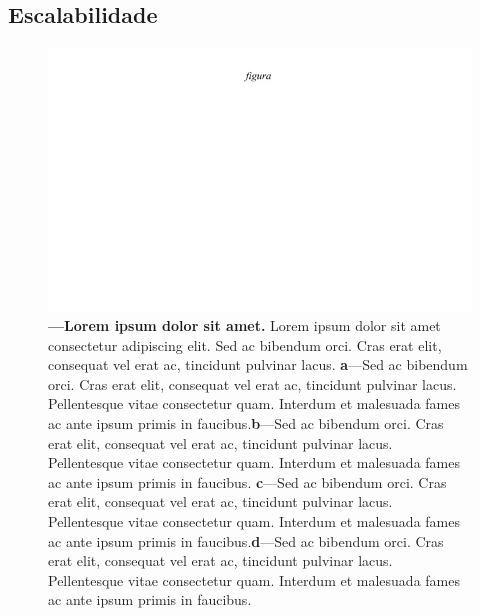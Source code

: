 \documentclass[./main.tex]{subfiles}
\begin{document}
\subsection{Escalabilidade}

\begin{figure}[t!] 
\centering				
\includegraphics[width=0.98\linewidth]{figs/fig_m.jpg}		
\caption[Lorem ipsum dolor sit amet]
{\textbf{---\;Lorem ipsum dolor sit amet.}
    Lorem ipsum dolor sit amet consectetur adipiscing elit. Sed ac bibendum orci. Cras erat elit, consequat vel erat ac, tincidunt pulvinar lacus. \;\textbf{a}\;---\;Sed ac bibendum orci. Cras erat elit, consequat vel erat ac, tincidunt pulvinar lacus. Pellentesque vitae consectetur quam. Interdum et malesuada fames ac ante ipsum primis in faucibus.\;\textbf{b}\;---\;Sed ac bibendum orci. Cras erat elit, consequat vel erat ac, tincidunt pulvinar lacus. Pellentesque vitae consectetur quam. Interdum et malesuada fames ac ante ipsum primis in faucibus. \;\textbf{c}\;---\;Sed ac bibendum orci. Cras erat elit, consequat vel erat ac, tincidunt pulvinar lacus. Pellentesque vitae consectetur quam. Interdum et malesuada fames ac ante ipsum primis in faucibus.\;\textbf{d}\;---\;Sed ac bibendum orci. Cras erat elit, consequat vel erat ac, tincidunt pulvinar lacus. Pellentesque vitae consectetur quam. Interdum et malesuada fames ac ante ipsum primis in faucibus.
}
\label{fig:hydro:scalability} 		
\end{figure}
\end{document}
